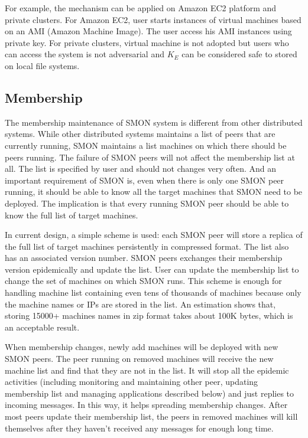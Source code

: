 For example, the mechanism can be applied on Amazon EC2
platform and private clusters. For Amazon EC2, user starts
instances of virtual machines based on an AMI (Amazon
Machine Image). The user access his AMI instances using
private key. For private clusters, virtual machine is not
adopted but users who can access the system is not
adversarial and $K_E$ can be considered safe to stored on
local file systems.

\subsection{Membership}

The membership maintenance of SMON system is different from
other distributed systems. While other distributed systems
maintains a list of peers that are currently running, SMON
maintains a list machines on which there should be peers
running. The failure of SMON peers will not affect the
membership list at all. The list is specified by user and
should not changes very often. And an important requirement
of SMON is, even when there is only one SMON peer running,
it should be able to know all the target machines that SMON
need to be deployed.  The implication is that every running
SMON peer should be able to know the full list of target
machines.

In current design, a simple scheme is used: each SMON peer
will store a replica of the full list of target machines
persistently in compressed format. The list also has an
associated version number. SMON peers exchanges their
membership version epidemically and update the list. User
can update the membership list to change the set of machines
on which SMON runs.
This scheme is enough for handling machine list containing
even tens of thousands of machines because only the machine
names or IPs are stored in the list.  An estimation shows
that, storing 15000+ machines names in zip format takes
about 100K bytes, which is an acceptable result.

When membership changes, newly add machines will be deployed
with new SMON peers. The peer running on removed machines
will receive the new machine list and find that they are not
in the list. It will stop all the epidemic activities
(including monitoring and maintaining other peer, updating
membership list and managing applications described below)
and just replies to incoming messages. In this way, it helps
spreading membership changes. After most peers update their
membership list, the peers in removed machines will kill
themselves after they haven't received any messages for
enough long time.

